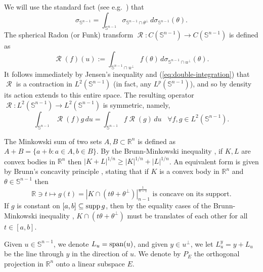\documentclass[11pt]{article}
\theoremstyle{definition}
\theoremstyle{proof}
\DeclareMathOperator{\+}{\mathop{\tilde{+}}}
\DeclareMathOperator{\sspan}{\textnormal{span}}
\DeclareMathOperator{\supp}{\textnormal{supp}}
\DeclareMathOperator{\Rad}{\mathcal{R}}
\newcommand{\R}{\mathbb{R}}
\renewcommand{\S}{\mathbb{S}}
\numberwithin{equation}{section}
\numberwithin{equation}{section}
\begin{document}
\smallskip
We will use the standard fact (see e.g.~\cite[Lemma 1.3.3]{Groemer}) that \begin{equation} \label{eq:double-integration}
\sigma_{\S^{n-1}} = \int_{\S^{n-1}} \sigma_{\S^{n-1} \cap \theta^{\perp}} \, d\sigma_{\S^{n-1}}(\theta) .
\end{equation}
The spherical Radon (or Funk) transform $\Rad : C(\S^{n-1}) \rightarrow C(\S^{n-1})$ is defined as
\[
\Rad(f)(u) := \int_{\S^{n-1} \cap u^\perp} f(\theta) \, d\sigma_{\S^{n-1} \cap u^\perp}(\theta) . 
\]
It follows immediately by Jensen's inequality and (\ref{eq:double-integration}) that $\Rad$ is a contraction in $L^2(\S^{n-1})$ (in fact, any $L^p(\S^{n-1})$),
and so by density its action extends to this entire space. The resulting operator $\Rad: L^2(\S^{n-1}) \rightarrow L^2(\S^{n-1})$ is symmetric, namely,
\begin{equation} \label{eq:Rad-symmetric}
\int_{\S^{n-1}} \Rad(f) g \, du = \int_{\S^{n-1}} f \Rad(g) \, du \;\;\; \forall f,g \in L^2(\S^{n-1}) . 
\end{equation}



\medskip

The Minkowski sum of two sets $A,B \subset \R^n$ is defined as $A + B  = \{ a+b : a\in A , b \in B\}$. By the Brunn-Minkowski inequality \cite{GardnerSurveyInBAMS, GardnerGeometricTomography2ndEd, Gruber-ConvexAndDiscreteGeometry,  Schneider-Book-2ndEd}, if $K,L$ are convex bodies in $\R^n$ then $|K+L|^{1/n} \geq |K|^{1/n} + |L|^{1/n}$. An equivalent form is given by Brunn's concavity principle \cite[Theorem 8.4]{Gruber-ConvexAndDiscreteGeometry}, stating that if $K$ is a convex body in $\R^n$ and $\theta \in \S^{n-1}$ then
\begin{equation} \label{eq:Brunn}
\R \ni t \mapsto g(t) = |K \cap (t \theta + \theta^{\perp})|^{\frac{1}{n-1}}_{n-1} \text{ is concave on its support.}
\end{equation}
If $g$ is constant on $[a,b] \subseteq \supp g$, then by the equality cases of the Brunn-Minkowski inequality \cite[Theorem 7.1.1]{Schneider-Book-2ndEd}, $K \cap  (t \theta + \theta^{\perp})$ must be translates of each other for all $t \in [a,b]$. 

\medskip

Given $u \in \S^{n-1}$, we denote $L_u = \sspan(u)$, and given $y \in u^{\perp}$, we let $L_u^y = y + L_u$ be the line through $y$ in the direction of $u$. 
We denote by $P_E$ the orthogonal projection in $\R^n$ onto a linear subspace $E$. 
\end{document}
